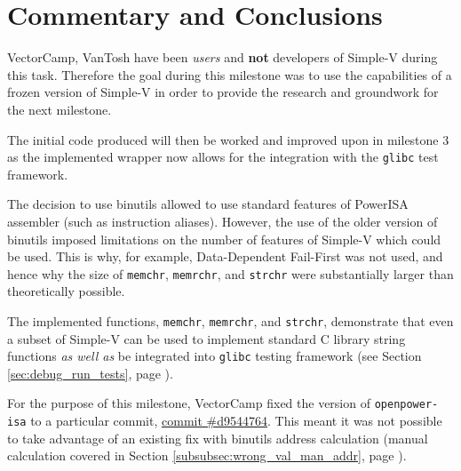 \chapter{Commentary and Conclusions}

VectorCamp, VanTosh have been \textit{users} and \textbf{not} developers
of Simple-V during this task.
Therefore the goal during this milestone was to use the capabilities of a
frozen version of Simple-V in order to provide the research and
groundwork for the next milestone.

The initial code produced will then be worked and improved upon in milestone 3
as the implemented wrapper now allows for the integration with the
\texttt{glibc} test framework.

The decision to use binutils allowed to use standard features of
PowerISA assembler (such as instruction aliases).
However, the use of the older version of binutils imposed limitations
on the number of features of
Simple-V which could be used. This is why, for example,
Data-Dependent Fail-First was not used, and hence why the size of
\texttt{memchr}, \texttt{memrchr}, and \texttt{strchr} were
substantially larger than theoretically possible.

The implemented functions, \texttt{memchr}, \texttt{memrchr},
and \texttt{strchr}, demonstrate that even a subset of Simple-V can be used
to implement standard C library string functions \textit{as well as} be
integrated into \texttt{glibc} testing framework
(see Section \ref{sec:debug_run_tests}, page \pageref{sec:debug_run_tests}).

For the purpose of this milestone, VectorCamp fixed the version of
\texttt{openpower-isa} to a particular commit,
\href{https://git.libre-soc.org/?p=openpower-isa.git;a=commitdiff;h=d9544764b1710f3807a9c0685d150a665f70b9a2}{commit \#d9544764}.
This meant it was not possible to take advantage of an existing fix
with binutils address calculation (manual calculation covered in Section
\ref{subsubsec:wrong_val_man_addr},
page \pageref{subsubsec:wrong_val_man_addr}).
